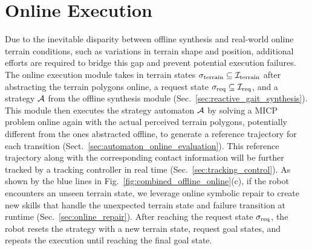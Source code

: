 \section{Online Execution}\label{sec:online_execution}
Due to the inevitable disparity between offline synthesis and real-world online terrain conditions, such as variations in terrain shape and position, additional efforts are required to bridge this gap and prevent potential execution failures. The online execution module takes in terrain states $\sigma_{\textrm{terrain}} \subseteq {\mathcal I}_{\textrm{terrain}}$ after abstracting the terrain polygons online, a request state $\sigma_{\textrm{req}} \subseteq {\mathcal I}_{\textrm{req}}$,
and a strategy ${\mathcal A}$
from the offline synthesis module (Sec.~\ref{sec:reactive_gait_synthesis}).
This module then executes the strategy automaton ${\mathcal A}$
by solving a MICP problem online again with the actual perceived terrain polygons, potentially different from the ones abstracted offline, 
to generate a reference trajectory for each transition (Sect.~\ref{sec:automaton_online_evaluation}). This reference trajectory 
along with the corresponding contact information will be further tracked by a tracking controller in real time
(Sec.~\ref{sec:tracking_control}).
As shown by the blue lines in Fig.~\ref{fig:combined_offline_online}(c),
if the robot encounters an unseen terrain state, 
we leverage online symbolic repair to create new skills that handle the unexpected terrain state and failure transition at runtime 
(Sec.~\ref{sec:online_repair}).
After reaching the request state $\sigma_{\textrm{req}}$,
the robot resets the strategy with a new terrain state, request goal states,
and repeats the execution
until reaching the final goal state.







